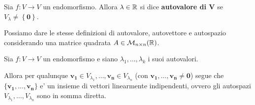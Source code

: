 \begin{definition}
    Sia $f : V \to V$ un endomorfismo. Allora $\lambda \in \mathbb{R}$ si dice \textbf{autovalore di $\bm{V}$} se $V_{\lambda} \neq \left\{ \bm{0}\right\}$.
\end{definition}

Possiamo dare le stesse definizioni di autovalore, autovettore e autospazio considerando una matrice quadrata $A \in \mathcal{M}_{n \times n}(\mathbb{R})$.

\begin{theorem}
    Sia $f : V \to V$ un endomorfismo e siano $\lambda_1, \dots, \lambda_k$ i suoi autovalori.

    Allora per qualunque $\bm{v_1} \in V_{\lambda_{1}}, \dots, \bm{v_n} \in V_{\lambda_n}$ (con $\bm{v_1}, \dots, \bm{v_n} \neq \bm 0$) segue che $\{\bm{v_1}, \dots, \bm{v_n}\}$ e' un insieme di vettori linearmente indipendenti, ovvero gli autospazi $V_{\lambda_1}, \dots, V_{\lambda_{n}}$ sono in somma diretta.
\end{theorem}
